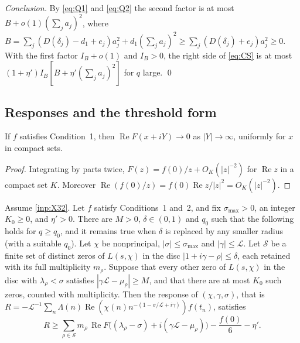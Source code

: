 \documentclass[11pt]{amsart}
\numberwithin{equation}{section}
\theoremstyle{plain}
\theoremstyle{definition}
\theoremstyle{remark}
\newcommand{\LL}{\mathcal{L}}
\renewcommand{\Re}{\operatorname{Re}}
\newcommand{\cS}{\mathcal{S}}
\newcommand{\1}{\mathbf{1}}
\begin{document}
\emph{Conclusion.} By \eqref{eq:Q1} and \eqref{eq:Q2} the second factor is at most
$B+o(1)(\sum_ja_j)^2$, where
$B=\sum_j(D(\delta_j)-d_1+e_j)a_j^2+d_1(\sum_ja_j)^2\ge\sum_j(D(\delta_j)+e_j)a_j^2\ge0$. With the first
factor $I_B+o(1)$ and $I_B>0$, the right side of \eqref{eq:CS} is at most
$(1+\eta')I_B[B+\eta'(\sum_ja_j)^2]$ for $q$ large. \qed

\subsection{Responses and the threshold form}

\begin{lemma}\label{lem:decaytransform}
If $f$ satisfies Condition~1, then $\Re F(x+iY)\to0$ as $|Y|\to\infty$, uniformly for $x$ in
compact sets.
\end{lemma}

\begin{proof}
Integrating by parts twice, $F(z)=f(0)/z+O_K(|z|^{-2})$ for $\Re z$ in a compact set $K$. Moreover
$\Re(f(0)/z)=f(0)\Re z/|z|^2=O_K(|z|^{-2})$.
\end{proof}

\begin{lemma}\label{lem:response}
Assume \cref{inp:X32}. Let $f$ satisfy Conditions~1 and~2, and fix $\sigma_{\max}>0$, an integer $K_0\ge0$, and
$\eta'>0$. There are $M>0$, $\delta\in(0,1)$ and $q_0$ such that the following holds for $q\ge q_0$,
and it remains true when $\delta$ is replaced by any smaller radius (with a suitable $q_0$).
Let $\chi$ be nonprincipal, $|\sigma|\le\sigma_{\max}$ and $|\gamma|\le\LL$. Let $\cS$ be a finite set
of distinct zeros of $L(s,\chi)$ in the disc $|1+i\gamma-\rho|\le\delta$, each retained with its
full multiplicity $m_\rho$. Suppose that every other zero of
$L(s,\chi)$ in the disc with $\lambda_\rho<\sigma$ satisfies $|\gamma\LL-\mu_\rho|\ge M$, and that there
are at most $K_0$ such zeros, counted with multiplicity. Then the response of $(\chi,\gamma,\sigma)$,
that is $R=-\LL^{-1}\sum_n\Lambda(n)\Re(\chi(n)n^{-(1-\sigma/\LL+i\gamma)})f(t_n)$, satisfies
\[
  R\ge\sum_{\rho\in\cS}m_\rho\,\Re F\bigl((\lambda_\rho-\sigma)+i(\gamma\LL-\mu_\rho)\bigr)
  -\frac{f(0)}6-\eta' .
\]
\end{lemma}
\end{document}
